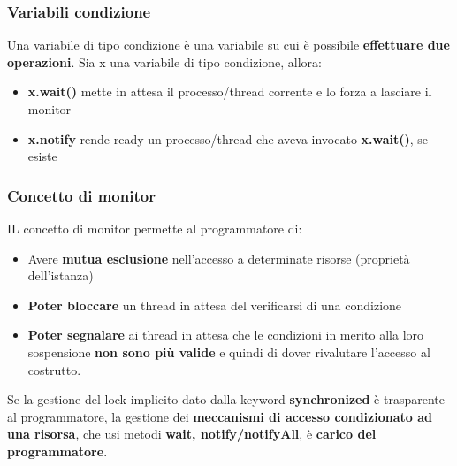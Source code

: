 \documentclass[12pt]{article}
\begin{document}
\subsubsection{Variabili condizione}
Una variabile di tipo condizione è una variabile su cui è possibile \textbf{effettuare due operazioni}. Sia x una variabile di tipo condizione, allora:
\begin{itemize}
    \item \textbf{x.wait()} mette in attesa il processo/thread corrente e lo forza a lasciare il monitor
    \item \textbf{x.notify} rende ready un processo/thread che aveva invocato \textbf{x.wait()}, se esiste
\end{itemize}
\subsubsection{Concetto di monitor}
IL concetto di monitor permette al programmatore di:
\begin{itemize}
    \item Avere \textbf{mutua esclusione} nell'accesso a determinate risorse (proprietà dell'istanza)
    \item \textbf{Poter bloccare} un thread in attesa del verificarsi di una condizione
    \item \textbf{Poter segnalare} ai thread in attesa che le condizioni in merito alla loro sospensione \textbf{non sono più valide} e quindi di dover rivalutare l'accesso al costrutto.
\end{itemize}
Se la gestione del lock implicito dato dalla keyword \textbf{synchronized} è trasparente al programmatore, la gestione dei \textbf{meccanismi di accesso condizionato ad una risorsa}, che usi metodi \textbf{wait, notify/notifyAll}, è \textbf{carico del programmatore}.
\end{document}
